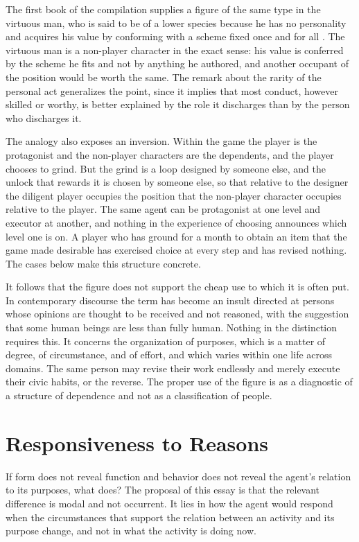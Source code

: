 \documentclass[11pt]{article}
\begin{document}
The first book of the compilation supplies a figure of the same type in the virtuous man, who is said to be of a lower species because he has no personality and acquires his value by conforming with a scheme fixed once and for all \cite[Aph.\ 319]{wtp1}. The virtuous man is a non-player character in the exact sense: his value is conferred by the scheme he fits and not by anything he authored, and another occupant of the position would be worth the same. The remark about the rarity of the personal act generalizes the point, since it implies that most conduct, however skilled or worthy, is better explained by the role it discharges than by the person who discharges it.

The analogy also exposes an inversion. Within the game the player is the protagonist and the non-player characters are the dependents, and the player chooses to grind. But the grind is a loop designed by someone else, and the unlock that rewards it is chosen by someone else, so that relative to the designer the diligent player occupies the position that the non-player character occupies relative to the player. The same agent can be protagonist at one level and executor at another, and nothing in the experience of choosing announces which level one is on. A player who has ground for a month to obtain an item that the game made desirable has exercised choice at every step and has revised nothing. The cases below make this structure concrete.

It follows that the figure does not support the cheap use to which it is often put. In contemporary discourse the term has become an insult directed at persons whose opinions are thought to be received and not reasoned, with the suggestion that some human beings are less than fully human. Nothing in the distinction requires this. It concerns the organization of purposes, which is a matter of degree, of circumstance, and of effort, and which varies within one life across domains. The same person may revise their work endlessly and merely execute their civic habits, or the reverse. The proper use of the figure is as a diagnostic of a structure of dependence and not as a classification of people.

\section{Responsiveness to Reasons}

If form does not reveal function and behavior does not reveal the agent's relation to its purposes, what does? The proposal of this essay is that the relevant difference is modal and not occurrent. It lies in how the agent would respond when the circumstances that support the relation between an activity and its purpose change, and not in what the activity is doing now.
\end{document}
